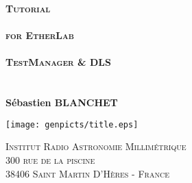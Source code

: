 \begin{titlepage}
\begin{center}
\vfill


\vfill
    {\huge\bfseries \textsc{Tutorial}}\\
    ~\\
    {\Large\bfseries \textsc{for EtherLab }}\\
    ~\\
    {\huge\bfseries \textsc{TestManager \& DLS}}\\
    ~\\
   \vfill {\Large \textbf{\docnum}}\\
 \vspace{1.5cm}
 {\Large\bfseries S\'ebastien BLANCHET}\\[5pt]
\vfill
{\builddate}

 \vspace{2cm}

\texttt{[image: genpicts/title.eps]}\\[5pt]

 \vfill
 \vfill

\textsc{Institut Radio Astronomie Millim\'etrique\\[5pt]
{300 rue de la piscine}\\[5pt]
{38406 Saint Martin D'H\`eres - France\\
}
}

\end{center}
\end{titlepage}
